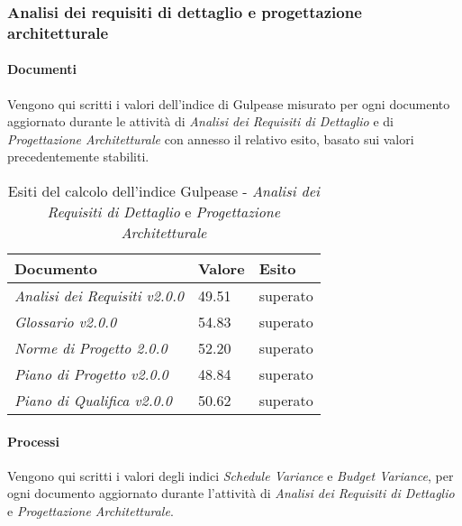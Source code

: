      \label{AdR_Dettaglio}
    \subsubsection{Analisi dei requisiti di dettaglio e progettazione architetturale}
    \paragraph{Documenti} \Spazio
    Vengono qui scritti i valori dell'indice di Gulpease misurato per ogni documento aggiornato durante le attività di \textit{Analisi dei Requisiti di Dettaglio} e di \emph{Progettazione Architetturale} con annesso il relativo esito, basato sui valori precedentemente stabiliti.
    
    \begin{table}[H]
    	\centering
    	\begin{tabular}{|C{7cm}|C{2cm}|C{2cm}|}
    		\hline
    		\textbf{Documento} & \textbf{Valore} & \textbf{Esito}  \\
    		\hline
    		\textit{Analisi dei Requisiti v2.0.0} & 49.51 & superato \\
    		\hline
    		\textit{Glossario v2.0.0} & 54.83 & superato \\
    		\hline
    		\textit{Norme di Progetto 2.0.0} & 52.20 & superato \\
    		\hline
    		\textit{Piano di Progetto v2.0.0} & 48.84 & superato \\
    		\hline
    		\textit{Piano di Qualifica v2.0.0} & 50.62 & superato \\
    		\hline
    		
    	\end{tabular}
    	\caption{Esiti del calcolo dell'indice Gulpease - \textit{Analisi dei Requisiti di Dettaglio} e \textit{Progettazione Architetturale}}
    \end{table}
    \paragraph{Processi} \Spazio
    Vengono qui scritti i valori degli indici \textit{Schedule Variance} e \textit{Budget Variance}, per ogni documento aggiornato durante l'attività di \textit{Analisi dei Requisiti di Dettaglio} e \textit{Progettazione Architetturale}. 
    
